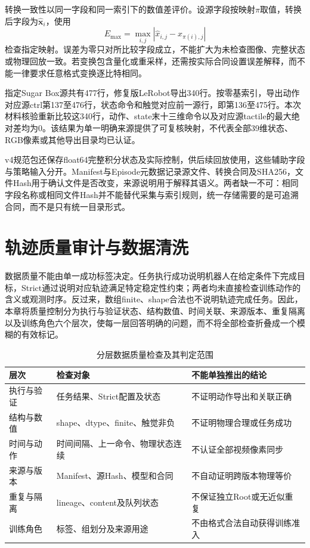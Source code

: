 转换一致性以同一字段和同一索引下的数值差评价。设源字段按映射$\pi$取值，转换后字段为$\hat{\boldsymbol x}_i$，使用
\begin{equation}
 E_{\max}=\max_{i,j}\left|\hat{x}_{i,j}-x_{\pi(i),j}\right|
 \label{eq:ch04_mapping_error}
\end{equation}
检查指定映射。误差为零只对所比较字段成立，不能扩大为未检查图像、完整状态或物理回放一致。若变换包含量化或重采样，还需按实际合同设置误差解释，而不能一律要求任意格式变换逐比特相同。

指定Sugar Box源共有477行，修复版LeRobot导出340行。按零基索引，导出动作对应源ctrl第137至476行，状态命令和触觉对应前一源行，即第136至475行。本次材料核验重新比较这340行，动作、state末十三维命令以及对应源tactile的最大绝对差均为0。该结果为单一明确来源提供了可复核映射，不代表全部39维状态、RGB像素或其他导出目录均已认证。

v4规范包还保存float64完整积分状态及实际控制，供后续回放使用，这些辅助字段与策略输入分开。Manifest与Episode元数据记录源文件、转换合同及SHA256，文件Hash用于确认文件是否改变，来源说明用于解释其语义。两者缺一不可：相同字段名称或相同文件Hash并不能替代采集与索引规则，统一存储需要的是可追溯合同，而不是只有统一目录形式。

\section{轨迹质量审计与数据清洗}
\label{sec:data_quality_control}

数据质量不能由单一成功标签决定。任务执行成功说明机器人在给定条件下完成目标，Strict通过说明对应轨迹满足特定稳定性约束；两者均未直接检查训练动作的含义或观测时序。反过来，数组finite、shape合法也不说明轨迹完成任务。因此，本章将质量控制分为执行与验证状态、结构数值、时间关联、来源版本、重复隔离以及训练角色六个层次，使每一层回答明确的问题，而不将全部检查折叠成一个模糊的有效标记。

\begin{table}[htbp]
 \centering\small
 \caption{分层数据质量检查及其判定范围}
 \label{tab:ch04_quality_gates}
 \begin{tabular}{p{}p{}p{}}
 \hline
 层次 & 检查对象 & 不能单独推出的结论\\
 \hline
 执行与验证 & 任务结果、Strict配置及状态 & 不证明动作导出和关联正确\\
 结构与数值 & shape、dtype、finite、触觉非负 & 不证明物理合理或任务成功\\
 时间与动作 & 时间间隔、上一命令、物理状态连续 & 不认证全部视频像素同步\\
 来源与版本 & Manifest、源Hash、模型和合同 & 不自动证明跨版本物理等价\\
 重复与隔离 & lineage、content及队列状态 & 不保证独立Root或无近似重复\\
 训练角色 & 标签、组划分及来源用途 & 不由格式合法自动获得训练准入\\
 \hline
 \end{tabular}
\end{table}

